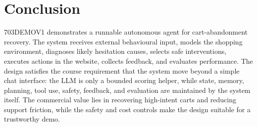\documentclass{article}
\begin{document}
\section{Conclusion}
703DEMOV1 demonstrates a runnable autonomous agent for cart-abandonment recovery. The system receives external behavioural input, models the shopping environment, diagnoses likely hesitation causes, selects safe interventions, executes actions in the website, collects feedback, and evaluates performance. The design satisfies the course requirement that the system move beyond a simple chat interface: the LLM is only a bounded scoring helper, while state, memory, planning, tool use, safety, feedback, and evaluation are maintained by the system itself. The commercial value lies in recovering high-intent carts and reducing support friction, while the safety and cost controls make the design suitable for a trustworthy demo.
\end{document}
